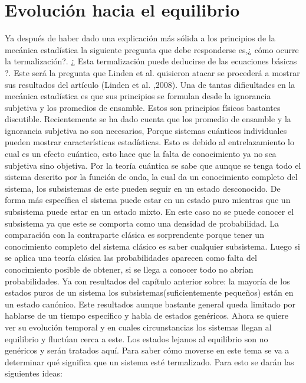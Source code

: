 \chapter{Evolución hacia el equilibrio}

Ya después de haber dado una explicación más sólida a los principios de la mecánica estadística la siguiente pregunta que debe responderse es,¿ cómo ocurre la termalización?. ¿ Esta termalización puede deducirse de las ecuaciones básicas ?. Este será la pregunta que Linden et al. quisieron atacar se procederá a mostrar sus resultados del artículo (Linden et al. ,2008). 
Una de tantas dificultades en la mecánica estadística es que sus principios se formulan desde la ignorancia subjetiva y los promedios de ensamble. Estos son principios físicos bastantes discutible.
Recientemente se ha dado cuenta que los promedio de ensamble y la ignorancia subjetiva no son necesarios, Porque sistemas cuánticos individuales pueden mostrar características estadísticas. Esto es debido al entrelazamiento lo cual es un efecto cuántico, esto hace que la falta de conocimiento ya no sea subjetiva sino objetiva. Por la teoría cuántica se sabe que aunque se tenga todo el sistema descrito por la función de onda, la cual da un conocimiento completo del sistema, los subsistemas de este pueden seguir en un estado desconocido. De forma más específica el sistema puede estar en un estado puro mientras que un subsistema puede estar en un estado mixto. En este caso no se puede conocer el subsistema ya que este se comporta como una densidad de probabilidad. La comparación con la contraparte clásica es sorprendente porque tener un conocimiento completo del sistema clásico es saber cualquier subsistema. Luego si se aplica una teoría clásica las probabilidades aparecen como falta del conocimiento posible de obtener, si se llega a conocer todo no abrían probabilidades.
Ya con resultados del capítulo anterior sobre: la mayoría de los estados puros de un sistema los subsistemas(suficientemente pequeños) están en un estado canónico. Este resultados aunque bastante general queda limitado por hablarse de un tiempo específico y habla de estados genéricos. Ahora se quiere ver su evolución temporal y en cuales circunstancias los sistemas llegan al equilibrio y fluctúan cerca a este. Los estados lejanos al equilibrio son no genéricos y serán tratados aquí. Para saber cómo moverse en este tema se va a determinar qué significa que un sistema esté termalizado. Para esto se darán las siguientes ideas:


